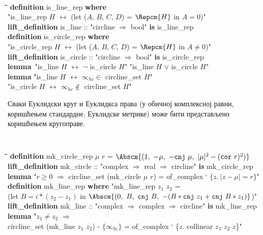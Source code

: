 {\tt
\begin{tabbing}
\hspace{5mm}\=\hspace{5mm}\=\hspace{5mm}\=\hspace{5mm}\=\hspace{5mm}\=\kill
{\bf definition} is\_line\_rep  {\bf where} \\
\>"is\_line\_rep $H$ $\longleftrightarrow$ (let ($A$, $B$, $C$, $D$) = $\Repcm{H}$ in $A = 0$)"\\
{\bf lift\_definition} is\_line :: "circline $\Rightarrow$ bool" {\bf is} is\_line\_rep\\
{\bf definition} is\_circle\_rep  {\bf where} \\
\>"is\_circle\_rep $H$ $\longleftrightarrow$ (let ($A$, $B$, $C$, $D$) = $\Repcm{H}$ in $A \neq 0$)"\\
{\bf lift\_definition} is\_circle :: "circline $\Rightarrow$ bool" {\bf is} is\_circle\_rep\\
{\bf lemma}\ "is\_line $H$ $\longleftrightarrow$ $\neg$ is\_circle $H$"   "is\_line $H$ $\vee$ is\_circle $H$"\\
{\bf lemma} \="is\_line $H$ $\longleftrightarrow$ $\infty_{hc} \in$ circline\_set $H$"\\
\>"is\_circle $H$ $\longleftrightarrow$ $\infty_{hc} \notin$ circline\_set $H$"
\end{tabbing}
}

Сваки Еуклидски круг и Еуклидкса права (у обичној комплексној равни,
коришћењем стандардне, Еуклидске метрике) може бити представљено
коришћењем кругоправе.  {\tt
  \begin{tabbing}
    \hspace{5mm}\=\hspace{5mm}\=\hspace{5mm}\=\hspace{5mm}\=\hspace{5mm}\=\kill
{\bf definition} mk\_circle\_rep $\mu$ $r$ = $\Abscm{(1,\ -\mu,\ -\mathtt{cnj}\ \mu,\ |\mu|^2-(\mathtt{cor}\ r)^2)}$\\
{\bf lift\_definition} mk\_circle :: "complex $\Rightarrow$ real $\Rightarrow$ circline" {\bf is} mk\_circle\_rep\\
{\bf lemma} "$r \ge 0$ $\Longrightarrow$ circline\_set (mk\_circle $\mu$ $r$) = of\_complex ` $\{z.\ |z - \mu| = r\}$"\\
{\bf definition} mk\_line\_rep {\bf where} "mk\_line\_rep $z_1$ $z_2$ = \\
\>  (let $B = i*(z_2-z_1)$ in $\Abscm{(0,\ B,\ \mathtt{cnj}\ B,\ -(B*\mathtt{cnj}\ z_1+\mathtt{cnj}\ B*z_1)}$)"\\
{\bf lift\_definition} mk\_line :: "complex $\Rightarrow$ complex $\Rightarrow$ circline" {\bf is} mk\_line\_rep\\
{\bf lemma} "$z_1 \neq z_2$ $\Longrightarrow$ \\
\> circline\_set (mk\_line $z_1$ $z_2$) - $\{\infty_{hc}\}$ = of\_complex ` \{$z$. collinear $z_1$ $z_2$ $z$\}"
  \end{tabbing}
}

